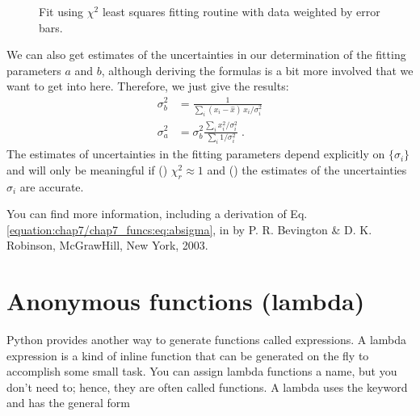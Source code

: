 \documentclass[letterpaper,10pt,english]{sphinxmanual}
\begin{document}
\begin{figure}[htbp]
\centering
\capstart

\noindent{}
\caption{Fit using \(\chi^2\) least squares fitting routine with data weighted by error bars.}\label{\detokenize{chap7/chap7_funcs:id3}}\label{\detokenize{chap7/chap7_funcs:fig-linregerrbars}}\end{figure}

\sphinxAtStartPar
We can also get estimates of the uncertainties in our determination of the fitting parameters \(a\) and \(b\), although deriving the formulas is a bit more involved that we want to get into here.  Therefore, we just give the results:
\begin{equation}\label{equation:chap7/chap7_funcs:eq:absigma}
\begin{split}\sigma_{b}^2 &= \frac{1} {\sum_{i}(x_{i} - \hat{x})\,x_{i}/\sigma_{i}^2}\\
\sigma_{a}^2 &= \sigma_{b}^2 \frac{\sum_{i}x_{i}^2/\sigma_{i}^2} {\sum_{i}1/\sigma_{i}^2}\;.\end{split}
\end{equation}
\sphinxAtStartPar
The estimates of uncertainties in the fitting parameters depend explicitly on \(\{\sigma_{i}\}\) and will only be meaningful if () \(\chi_{r}^2 \approx 1\) and () the estimates of the uncertainties \(\sigma_{i}\) are accurate.

\sphinxAtStartPar
You can find more information, including a derivation of Eq. \eqref{equation:chap7/chap7_funcs:eq:absigma}, in  by P. R. Bevington \& D. K. Robinson, McGraw\sphinxhyphen{}Hill, New York, 2003.

\ignorespaces 

\section{Anonymous functions (lambda)}
\label{\detokenize{chap7/chap7_funcs:anonymous-functions-lambda}}\label{\detokenize{chap7/chap7_funcs:lambda}}\label{\detokenize{chap7/chap7_funcs:index-7}}
\sphinxAtStartPar
Python provides another way to generate functions called  expressions.  A lambda expression is a kind of in\sphinxhyphen{}line function that can be generated on the fly to accomplish some small task.  You can assign lambda functions a name, but you don’t need to; hence, they are often called  functions.  A lambda uses the keyword  and has the general form
\end{document}
